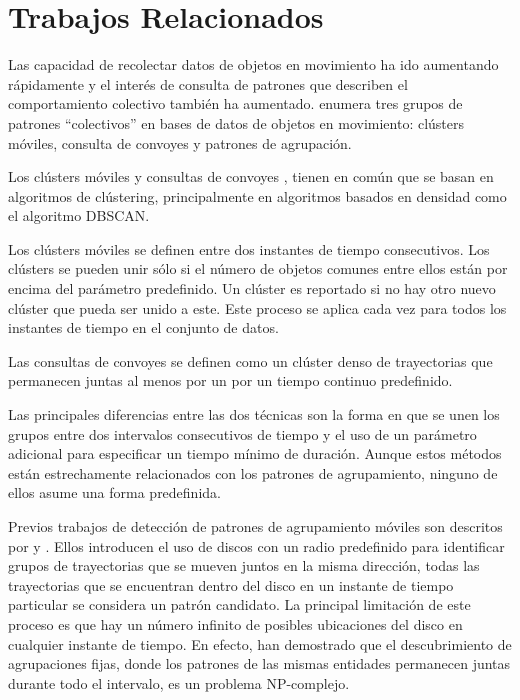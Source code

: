 \section{Trabajos Relacionados}

Las capacidad de recolectar datos de objetos en movimiento ha ido aumentando rápidamente y el interés de consulta
de patrones que describen el comportamiento colectivo también ha aumentado. \cite{vieira2009line} enumera tres grupos de patrones
``colectivos'' en bases de datos de objetos en movimiento: clústers móviles, consulta de convoyes y patrones de agrupación.

Los clústers móviles \cite{jensen2007continuous} \cite{kalnis2005discovering} \cite{li2008mining} 
y  consultas de convoyes  \cite{jeung2008discovery-1} \cite{jeung2008convoy}, tienen en común que se basan en algoritmos
de clústering, principalmente en algoritmos basados en densidad como el algoritmo DBSCAN\cite{ester1996density}.

Los clústers móviles se definen entre dos instantes de tiempo consecutivos.
Los clústers  se pueden unir sólo si el número de objetos comunes entre ellos están por encima del parámetro predefinido.
Un clúster es reportado si no hay otro nuevo clúster que pueda ser unido a este. Este proceso se aplica cada vez para 
todos los instantes de tiempo en el conjunto de datos. 

Las consultas de convoyes se definen como un clúster denso de trayectorias que permanecen juntas al menos por un por
un tiempo continuo predefinido. 

Las principales diferencias entre las dos técnicas son la forma en que se unen los grupos  entre dos intervalos
consecutivos de tiempo y el uso de un parámetro adicional para especificar un tiempo mínimo de duración. Aunque
estos métodos están estrechamente relacionados con los patrones de agrupamiento, ninguno de ellos asume una  forma predefinida.

Previos trabajos de detección de patrones de agrupamiento móviles son descritos por \cite{ gudmundsson2006computing}
y \cite{benkert2008reporting}. Ellos introducen
el uso de discos con un radio predefinido para identificar  grupos de trayectorias que se mueven juntos en la misma
dirección, todas las trayectorias que se encuentran dentro del disco en un instante  de tiempo particular se 
considera un patrón candidato. La principal limitación de este proceso es que hay un número infinito de posibles
ubicaciones del disco en cualquier instante de tiempo. En efecto, \cite{gudmundsson2006computing} han demostrado
que el descubrimiento de agrupaciones fijas, donde los patrones de las mismas entidades permanecen juntas durante 
todo el intervalo, es un problema NP-complejo. 

